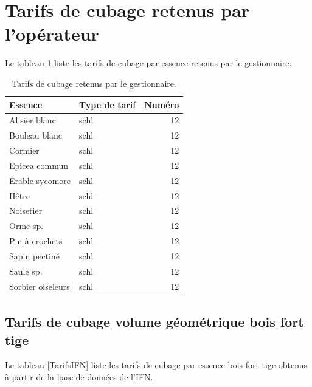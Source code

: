 \documentclass[a4paper]{book}\usepackage[]{graphicx}\usepackage[]{color}
\begin{document}
\section{Tarifs de cubage retenus par l'opérateur}
Le tableau \ref{TarifsOp} liste les tarifs de cubage par essence retenus par le gestionnaire.
\begin{table}[ht]
\centering
{\footnotesize
\begin{tabular}{llr}
  \hline
Essence & Type de tarif & Numéro \\ 
  \hline
Alisier blanc & schl & 12 \\ 
  Bouleau blanc & schl & 12 \\ 
  Cormier & schl & 12 \\ 
  Epicea commun & schl & 12 \\ 
  Erable sycomore & schl & 12 \\ 
  Hêtre & schl & 12 \\ 
  Noisetier & schl & 12 \\ 
  Orme sp. & schl & 12 \\ 
  Pin à crochets & schl & 12 \\ 
  Sapin pectiné & schl & 12 \\ 
  Saule sp. & schl & 12 \\ 
  Sorbier oiseleurs & schl & 12 \\ 
   \hline
\end{tabular}
}
\caption{Tarifs de cubage retenus par le gestionnaire.} 
\label{TarifsOp}
\end{table}


\subsection{Tarifs de cubage volume géométrique bois fort tige}
Le tableau \ref{TarifsIFN} liste les tarifs de cubage par essence bois fort tige obtenus à partir de la base de données de l'IFN.
\end{document}

